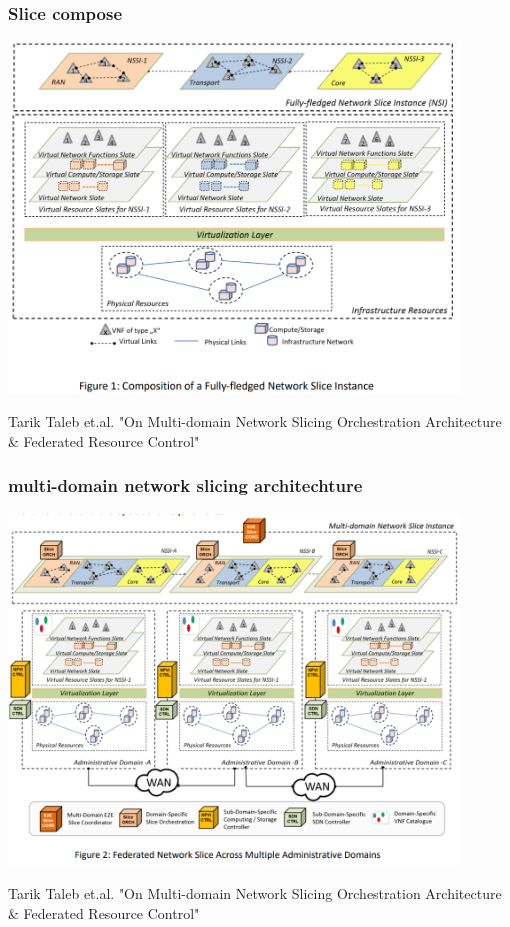\documentclass{beamer}
\begin{document}
\begin{frame}
  \frametitle{Slice compose}
  \center
  \includegraphics[width=0.9\textwidth]{images/ns-compose1}
  
  \tiny {Tarik Taleb et.al. "On Multi-domain Network Slicing Orchestration
Architecture \& Federated Resource Control"}

\end{frame}


\begin{frame}
  \frametitle{multi-domain network slicing architechture}
  \center
  \includegraphics[width=0.9\textwidth]{images/ns-compose-arch}
  
  \tiny {Tarik Taleb et.al. "On Multi-domain Network Slicing Orchestration
Architecture \& Federated Resource Control"}

\end{frame}
\end{document}
